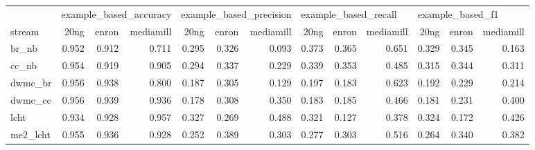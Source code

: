 \begin{tabular}{lrrrrrrrrrrrr}
	\toprule
	                & \multicolumn{3}{l}{example\_based\_accuracy} & \multicolumn{3}{l}{example\_based\_precision} & \multicolumn{3}{l}{example\_based\_recall} & \multicolumn{3}{l}{example\_based\_f1}                                                                             \\
	stream          & 20ng                                         & enron                                         & mediamill                                  & 20ng                                   & enron & mediamill & 20ng  & enron & mediamill & 20ng  & enron & mediamill \\
	\midrule
	br\_nb          & 0.952                                        & 0.912                                         & 0.711                                      & 0.295                                  & 0.326 & 0.093     & 0.373 & 0.365 & 0.651     & 0.329 & 0.345 & 0.163     \\
	cc\_nb          & 0.954                                        & 0.919                                         & 0.905                                      & 0.294                                  & 0.337 & 0.229     & 0.339 & 0.353 & 0.485     & 0.315 & 0.344 & 0.311     \\
	dwmc\_br        & 0.956                                        & 0.938                                         & 0.800                                      & 0.187                                  & 0.305 & 0.129     & 0.197 & 0.183 & 0.623     & 0.192 & 0.229 & 0.214     \\
	dwmc\_cc        & 0.956                                        & 0.939                                         & 0.936                                      & 0.178                                  & 0.308 & 0.350     & 0.183 & 0.185 & 0.466     & 0.181 & 0.231 & 0.400     \\
	lcht            & 0.934                                        & 0.928                                         & 0.957                                      & 0.327                                  & 0.269 & 0.488     & 0.321 & 0.127 & 0.378     & 0.324 & 0.172 & 0.426     \\
	me2\_lcht       & 0.955                                        & 0.936                                         & 0.928                                      & 0.252                                  & 0.389 & 0.303     & 0.277 & 0.303 & 0.516     & 0.264 & 0.340 & 0.382     \\

\end{tabular}
